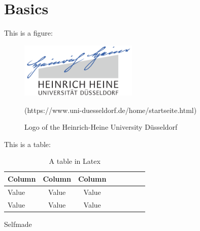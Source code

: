 \newpage
\section{Basics} \label{sec:basics}

This is a figure: 
\begin{figure}[h]
	\centering
	\includegraphics[width=0.5\textwidth]{graphs/hhulogo.png}
	\caption{Logo of the Heinrich-Heine University Düsseldorf}
	\quelle (https://www.uni-duesseldorf.de/home/startseite.html)
	\label{img:hhulogo}
\end{figure}

This is a table: 
\begin{table}[h]
\centering
\begin{tabular}{l*{6}{c}r}
Column  & Column & Column \\
\hline
Value & Value & Value  \\
Value  & Value & Value 
\end{tabular}
\caption{A table in Latex}
\quelle Selfmade
\label{table:table}
\end{table}